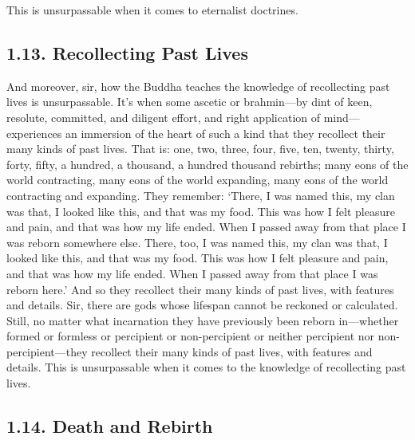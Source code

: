 \documentclass[12pt,openany]{book}%
\begin{document}
This is unsurpassable when it comes to eternalist doctrines. 

\subsection*{1.13. Recollecting Past Lives }

And moreover, sir, how the Buddha teaches the knowledge of recollecting past lives is unsurpassable. It’s when some ascetic or brahmin—by dint of keen, resolute, committed, and diligent effort, and right application of mind—experiences an immersion of the heart of such a kind that they recollect their many kinds of past lives. That is: one, two, three, four, five, ten, twenty, thirty, forty, fifty, a hundred, a thousand, a hundred thousand rebirths; many eons of the world contracting, many eons of the world expanding, many eons of the world contracting and expanding. They remember: ‘There, I was named this, my clan was that, I looked like this, and that was my food. This was how I felt pleasure and pain, and that was how my life ended. When I passed away from that place I was reborn somewhere else. There, too, I was named this, my clan was that, I looked like this, and that was my food. This was how I felt pleasure and pain, and that was how my life ended. When I passed away from that place I was reborn here.’ And so they recollect their many kinds of past lives, with features and details. Sir, there are gods whose lifespan cannot be reckoned or calculated. Still, no matter what incarnation they have previously been reborn in—whether formed or formless or percipient or non-percipient or neither percipient nor non-percipient—they recollect their many kinds of past lives, with features and details. This is unsurpassable when it comes to the knowledge of recollecting past lives. 

\subsection*{1.14. Death and Rebirth }
\end{document}

